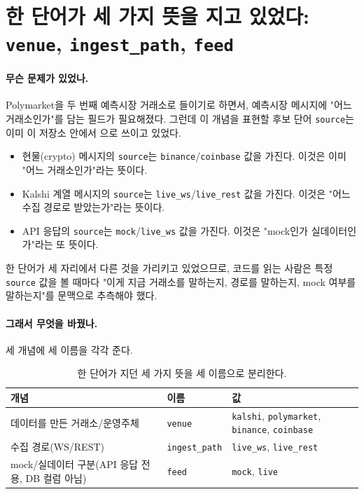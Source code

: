 \section{한 단어가 세 가지 뜻을 지고 있었다: \texttt{venue}, \texttt{ingest\_path}, \texttt{feed}}
\label{sec:contract-venue}

\paragraph{무슨 문제가 있었나.} Polymarket을 두 번째 예측시장 거래소로 들이기로
하면서, 예측시장 메시지에 "어느 거래소인가"를 담는 필드가 필요해졌다. 그런데 이
개념을 표현할 후보 단어 \texttt{source}는 이미 이 저장소 안에서 으로 쓰이고 있었다.

\begin{itemize}
  \item 현물(crypto) 메시지의 \texttt{source}는 \texttt{binance}/\texttt{coinbase}
    값을 가진다. 이것은 이미 "어느 거래소인가"라는 뜻이다.
  \item Kalshi 계열 메시지의 \texttt{source}는 \texttt{live\_ws}/\texttt{live\_rest}
    값을 가진다. 이것은 "어느 수집 경로로 받았는가"라는  뜻이다.
  \item API 응답의 \texttt{source}는 \texttt{mock}/\texttt{live\_ws} 값을 가진다. 이것은 "mock인가 실데이터인가"라는 또  뜻이다.
\end{itemize}

한 단어가 세 자리에서 다른 것을 가리키고 있었으므로, 코드를 읽는 사람은 특정
\texttt{source} 값을 볼 때마다 "이게 지금 거래소를 말하는지, 경로를 말하는지, mock
여부를 말하는지"를 문맥으로 추측해야 했다.

\paragraph{그래서 무엇을 바꿨나.} 세 개념에 세 이름을 각각 준다.

\begin{table}[htbp]
  \centering
  \small
  \begin{tabularx}{\linewidth}{@{}lXX@{}}
    \toprule
    개념 & 이름 & 값 \\
    \midrule
    데이터를 만든 거래소/운영주체 & \texttt{venue} & \texttt{kalshi}, \texttt{polymarket},
      \texttt{binance}, \texttt{coinbase} \\
    수집 경로(WS/REST) & \texttt{ingest\_path} & \texttt{live\_ws}, \texttt{live\_rest} \\
    mock/실데이터 구분(API 응답 전용, DB 컬럼 아님) & \texttt{feed} & \texttt{mock},
      \texttt{live} \\
    \bottomrule
  \end{tabularx}
  \caption{한 단어가 지던 세 가지 뜻을 세 이름으로 분리한다.}
  \label{tab:contract-venue-split}
\end{table}

